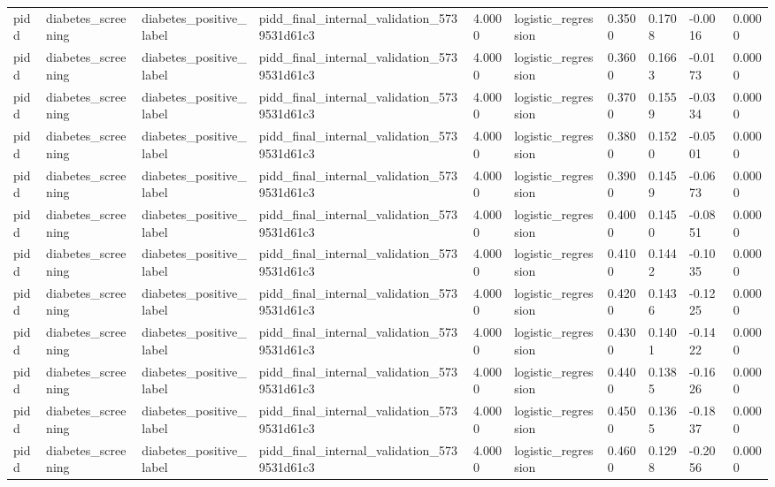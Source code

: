 \begin{tabular}{llllllllll}
pidd & diabetes\_screening & diabetes\_positive\_label & pidd\_final\_internal\_validation\_5739531d61c3 & 4.0000 & logistic\_regression & 0.3500 & 0.1708 & -0.0016 & 0.0000 \\
pidd & diabetes\_screening & diabetes\_positive\_label & pidd\_final\_internal\_validation\_5739531d61c3 & 4.0000 & logistic\_regression & 0.3600 & 0.1663 & -0.0173 & 0.0000 \\
pidd & diabetes\_screening & diabetes\_positive\_label & pidd\_final\_internal\_validation\_5739531d61c3 & 4.0000 & logistic\_regression & 0.3700 & 0.1559 & -0.0334 & 0.0000 \\
pidd & diabetes\_screening & diabetes\_positive\_label & pidd\_final\_internal\_validation\_5739531d61c3 & 4.0000 & logistic\_regression & 0.3800 & 0.1520 & -0.0501 & 0.0000 \\
pidd & diabetes\_screening & diabetes\_positive\_label & pidd\_final\_internal\_validation\_5739531d61c3 & 4.0000 & logistic\_regression & 0.3900 & 0.1459 & -0.0673 & 0.0000 \\
pidd & diabetes\_screening & diabetes\_positive\_label & pidd\_final\_internal\_validation\_5739531d61c3 & 4.0000 & logistic\_regression & 0.4000 & 0.1450 & -0.0851 & 0.0000 \\
pidd & diabetes\_screening & diabetes\_positive\_label & pidd\_final\_internal\_validation\_5739531d61c3 & 4.0000 & logistic\_regression & 0.4100 & 0.1442 & -0.1035 & 0.0000 \\
pidd & diabetes\_screening & diabetes\_positive\_label & pidd\_final\_internal\_validation\_5739531d61c3 & 4.0000 & logistic\_regression & 0.4200 & 0.1436 & -0.1225 & 0.0000 \\
pidd & diabetes\_screening & diabetes\_positive\_label & pidd\_final\_internal\_validation\_5739531d61c3 & 4.0000 & logistic\_regression & 0.4300 & 0.1401 & -0.1422 & 0.0000 \\
pidd & diabetes\_screening & diabetes\_positive\_label & pidd\_final\_internal\_validation\_5739531d61c3 & 4.0000 & logistic\_regression & 0.4400 & 0.1385 & -0.1626 & 0.0000 \\
pidd & diabetes\_screening & diabetes\_positive\_label & pidd\_final\_internal\_validation\_5739531d61c3 & 4.0000 & logistic\_regression & 0.4500 & 0.1365 & -0.1837 & 0.0000 \\
pidd & diabetes\_screening & diabetes\_positive\_label & pidd\_final\_internal\_validation\_5739531d61c3 & 4.0000 & logistic\_regression & 0.4600 & 0.1298 & -0.2056 & 0.0000 \\

\end{tabular}
